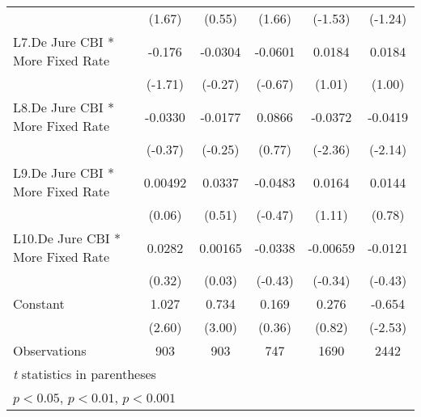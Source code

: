 {\begin{tabular}{l*{5}{c}}
                &   (1.67)         &   (0.55)         &   (1.66)         &  (-1.53)         &  (-1.24)         \\
[1em]
L7.De Jure CBI * More Fixed Rate&   -0.176         &  -0.0304         &  -0.0601         &   0.0184         &   0.0184         \\
                &  (-1.71)         &  (-0.27)         &  (-0.67)         &   (1.01)         &   (1.00)         \\
[1em]
L8.De Jure CBI * More Fixed Rate&  -0.0330         &  -0.0177         &   0.0866         &  -0.0372\sym{*}  &  -0.0419\sym{*}  \\
                &  (-0.37)         &  (-0.25)         &   (0.77)         &  (-2.36)         &  (-2.14)         \\
[1em]
L9.De Jure CBI * More Fixed Rate&  0.00492         &   0.0337         &  -0.0483         &   0.0164         &   0.0144         \\
                &   (0.06)         &   (0.51)         &  (-0.47)         &   (1.11)         &   (0.78)         \\
[1em]
L10.De Jure CBI * More Fixed Rate&   0.0282         &  0.00165         &  -0.0338         & -0.00659         &  -0.0121         \\
                &   (0.32)         &   (0.03)         &  (-0.43)         &  (-0.34)         &  (-0.43)         \\
[1em]
Constant        &    1.027\sym{*}  &    0.734\sym{**} &    0.169         &    0.276         &   -0.654\sym{*}  \\
                &   (2.60)         &   (3.00)         &   (0.36)         &   (0.82)         &  (-2.53)         \\
\hline
Observations    &      903         &      903         &      747         &     1690         &     2442         \\
\hline\hline
\multicolumn{6}{l}{\footnotesize \textit{t} statistics in parentheses}\\
\multicolumn{6}{l}{\footnotesize \sym{*} \(p<0.05\), \sym{**} \(p<0.01\), \sym{***} \(p<0.001\)}\\
\end{tabular}
}
